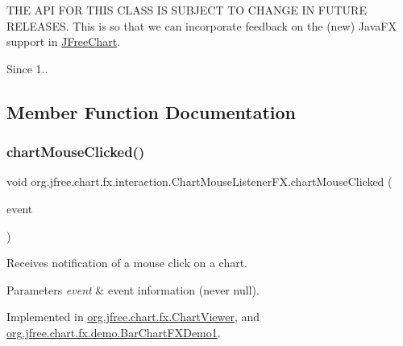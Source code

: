 T\+HE A\+PI F\+OR T\+H\+IS C\+L\+A\+SS IS S\+U\+B\+J\+E\+CT TO C\+H\+A\+N\+GE IN F\+U\+T\+U\+RE R\+E\+L\+E\+A\+S\+ES. This is so that we can incorporate feedback on the (new) Java\+FX support in \mbox{\hyperlink{classorg_1_1jfree_1_1chart_1_1_j_free_chart}{J\+Free\+Chart}}.

\begin{DoxySince}{Since}
1.. 
\end{DoxySince}


\subsection{Member Function Documentation}
\mbox{\label{interfaceorg_1_1jfree_1_1chart_1_1fx_1_1interaction_1_1_chart_mouse_listener_f_x_a7953c88563d5cd432d8232f3ade82403}} 
\subsubsection{\texorpdfstring{chart\+Mouse\+Clicked()}{chartMouseClicked()}}
{\footnotesize\ttfamily void org.\+jfree.\+chart.\+fx.\+interaction.\+Chart\+Mouse\+Listener\+F\+X.\+chart\+Mouse\+Clicked (\begin{DoxyParamCaption}\item[{\mbox{\hyperlink{classorg_1_1jfree_1_1chart_1_1fx_1_1interaction_1_1_chart_mouse_event_f_x}{Chart\+Mouse\+Event\+FX}}}]{event }\end{DoxyParamCaption})}

Receives notification of a mouse click on a chart.


\begin{DoxyParams}{Parameters}
{\em event} & event information (never {\ttfamily null}). \\
\hline
\end{DoxyParams}


Implemented in \mbox{\hyperlink{classorg_1_1jfree_1_1chart_1_1fx_1_1_chart_viewer_ab66028016a6de04fe52b66013545f0bc}{org.\+jfree.\+chart.\+fx.\+Chart\+Viewer}}, and \mbox{\hyperlink{classorg_1_1jfree_1_1chart_1_1fx_1_1demo_1_1_bar_chart_f_x_demo1_af23c9d454410ccba9b31d1b99ac0f153}{org.\+jfree.\+chart.\+fx.\+demo.\+Bar\+Chart\+F\+X\+Demo1}}.

